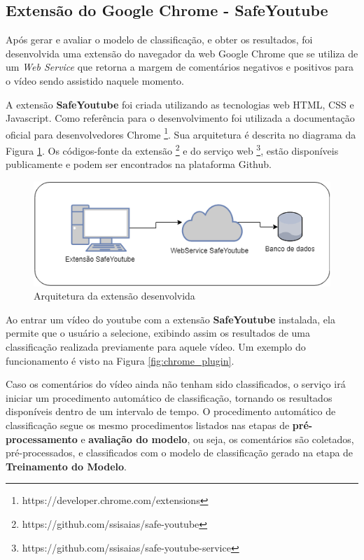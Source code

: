 \subsection{Extensão do Google Chrome - SafeYoutube}

Após gerar e avaliar o modelo de classificação, e obter os resultados, foi desenvolvida uma extensão do navegador da web Google Chrome que se utiliza de um \textit{Web Service} que retorna a margem de comentários negativos e positivos para o vídeo sendo assistido naquele momento.

A extensão \textbf{SafeYoutube} foi criada utilizando as tecnologias web HTML, CSS e Javascript. Como referência para o desenvolvimento foi utilizada a documentação oficial para desenvolvedores Chrome \footnote{https://developer.chrome.com/extensions}. Sua arquitetura é descrita no diagrama da Figura \ref{fig:chrome_plugin_design}. Os códigos-fonte da extensão \footnote{https://github.com/ssisaias/safe-youtube} e do serviço web \footnote{https://github.com/ssisaias/safe-youtube-service}, estão disponíveis publicamente e podem ser encontrados na plataforma Github.

\begin{figure}[H] %
	\caption{\label{fig:chrome_plugin_design} Arquitetura da extensão desenvolvida}
	\begin{center}
	    \includegraphics[scale=0.7]{figuras/safeYoutube.png} %
	\end{center}
\end{figure}

Ao entrar um vídeo do youtube com a extensão \textbf{SafeYoutube} instalada, ela permite que o usuário a selecione, exibindo assim os resultados de uma classificação realizada previamente para aquele vídeo. Um exemplo do funcionamento é visto na Figura \ref{fig:chrome_plugin}. 

Caso os comentários do vídeo ainda não tenham sido classificados, o serviço irá iniciar um procedimento automático de classificação, tornando os resultados disponíveis dentro de um intervalo de tempo. O procedimento automático de classificação segue os mesmo procedimentos listados nas etapas de \textbf{pré-processamento} e \textbf{avaliação do modelo}, ou seja, os comentários são coletados, pré-processados, e classificados com o modelo de classificação gerado na etapa de \textbf{Treinamento do Modelo}.

